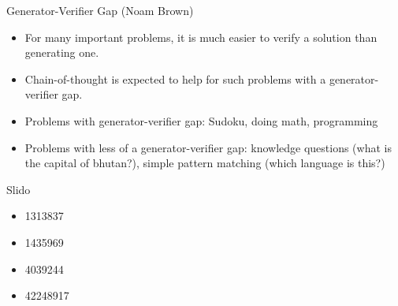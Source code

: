 \documentclass[11pt,compress,t,notes=noshow, xcolor=table]{beamer}
\begin{document}
\begin{frame}{Generator-Verifier Gap (Noam Brown)}

\vfill

\begin{itemize}
    \item For many important problems, it is much easier to
    verify a solution than generating one.
    \item Chain-of-thought is expected to help for such
    problems with a generator-verifier gap.
    \item Problems with generator-verifier gap: Sudoku,
    doing math, programming
    \item Problems with less of a generator-verifier gap:
    knowledge questions (what is the capital of bhutan?),
    simple pattern matching (which language is this?)
    
\end{itemize}

\vfill

\end{frame}

\begin{frame}{Slido}

\vfill

\begin{itemize}
    \item 1313837 
    \item 1435969 
    \item 4039244 
    \item 42248917 
\end{itemize}

\vfill

\end{frame}


\endlecture
\end{document}

